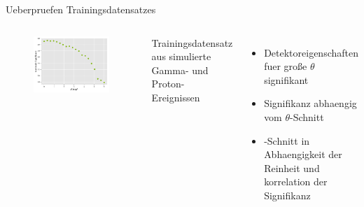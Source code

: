 \documentclass[aspectratio=1610, professionalfonts, 9pt]{beamer}
\begin{document}
\begin{frame}{Ueberpruefen Trainingsdatensatzes}
  \begin{columns}
	\begin{figure}
	  \centering
	  \includegraphics[width=\textwidth]{./Plots/corr_sig_theta2.pdf}
	\end{figure}
	Trainingsdatensatz aus simulierte Gamma- und Proton-Ereignissen
	\begin{itemize}
	  \item Detektoreigenschaften fuer große $\theta$ signifikant
	  \item Signifikanz abhaengig vom $\theta$-Schnitt
	  \item \theta-Schnitt in Abhaengigkeit der Reinheit und korrelation der Signifikanz
	\end{itemize}
  \end{columns}
\end{frame}
\end{document}
